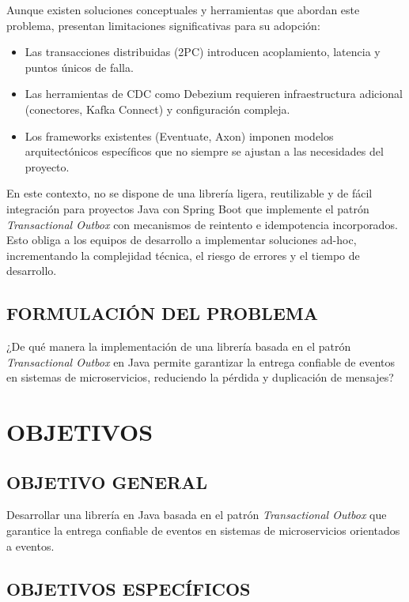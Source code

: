 Aunque existen soluciones conceptuales y herramientas que abordan este problema, presentan limitaciones significativas para su adopción:

\begin{itemize}
    \item Las transacciones distribuidas (2PC) introducen acoplamiento, latencia y puntos únicos de falla.
    \item Las herramientas de CDC como Debezium requieren infraestructura adicional (conectores, Kafka Connect) y configuración compleja.
    \item Los frameworks existentes (Eventuate, Axon) imponen modelos arquitectónicos específicos que no siempre se ajustan a las necesidades del proyecto.
\end{itemize}

En este contexto, no se dispone de una librería ligera, reutilizable y de fácil integración para proyectos Java con Spring Boot que implemente el patrón \textit{Transactional Outbox} con mecanismos de reintento e idempotencia incorporados. Esto obliga a los equipos de desarrollo a implementar soluciones ad-hoc, incrementando la complejidad técnica, el riesgo de errores y el tiempo de desarrollo.

\subsection{FORMULACIÓN DEL PROBLEMA}

¿De qué manera la implementación de una librería basada en el patrón \textit{Transactional Outbox} en Java permite garantizar la entrega confiable de eventos en sistemas de microservicios, reduciendo la pérdida y duplicación de mensajes?

\section{OBJETIVOS}

\subsection{OBJETIVO GENERAL}

Desarrollar una librería en Java basada en el patrón \textit{Transactional Outbox} que garantice la entrega confiable de eventos en sistemas de microservicios orientados a eventos.

\subsection{OBJETIVOS ESPECÍFICOS}

